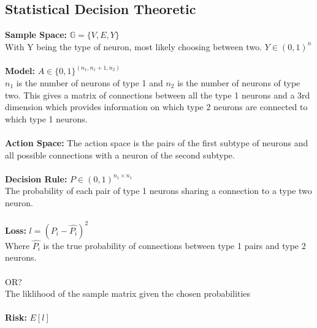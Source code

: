 \documentclass[12pt]{article}
\begin{document}
\subsection*{Statistical Decision Theoretic}
\textbf{Sample Space:} $\mathbb{G}=\{V,E,Y\}$
\\With Y being the type of neuron, most likely choosing between two. $Y \in (0,1)^n$
\\
\\\textbf{Model:} $A \in \{0,1\}^{(n_1,n_1+1,n_2)}$
\\$n_1$ is the number of neurons of type 1 and $n_2$ is the number of neurons of type two. This gives a matrix of connections between all the type 1 neurons and a 3rd dimension which provides information on which type 2 neurons are connected to which type 1 neurons.
\\
\\\textbf{Action Space:} The action space is the pairs of the first subtype of neurons and all possible connections with a neuron of the second subtype.
\\
\\\textbf{Decision Rule:} $P \in (0,1)^{n_1 \times n_1}$
\\The probability of each pair of type 1 neurons sharing a connection to a type two neuron.
\\
\\\textbf{Loss:} $l=(P_i - \hat{P_i})^2$
\\Where $\hat{P_i}$ is the true probability of connections between type 1 pairs and type 2 neurons.
\\
\\OR?
\\The liklihood of the sample matrix given the chosen probabilities
\\
\\\textbf{Risk:} $E[l]$
\end{document}
